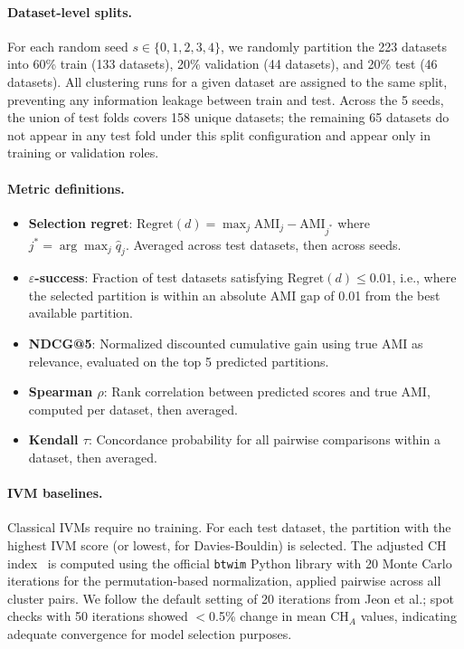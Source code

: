 \documentclass[10pt]{article} %
\begin{document}
\paragraph{Dataset-level splits.}
For each random seed $s \in \{0, 1, 2, 3, 4\}$, we randomly partition the 223 datasets into 60\% train (133 datasets), 20\% validation (44 datasets), and 20\% test (46 datasets). All clustering runs for a given dataset are assigned to the same split, preventing any information leakage between train and test. Across the 5 seeds, the union of test folds covers 158 unique datasets; the remaining 65 datasets do not appear in any test fold under this split configuration and appear only in training or validation roles.

\paragraph{Metric definitions.}
\begin{itemize}
    \item \textbf{Selection regret}: $\text{Regret}(d) = \max_j \text{AMI}_j - \text{AMI}_{j^*}$ where $j^* = \arg\max_j \hat{q}_j$. Averaged across test datasets, then across seeds.
    \item \textbf{$\varepsilon$-success}: Fraction of test datasets satisfying $\text{Regret}(d) \leq 0.01$, i.e., where the selected partition is within an absolute AMI gap of 0.01 from the best available partition.
    \item \textbf{NDCG@5}: Normalized discounted cumulative gain using true AMI as relevance, evaluated on the top 5 predicted partitions.
    \item \textbf{Spearman $\rho$}: Rank correlation between predicted scores and true AMI, computed per dataset, then averaged.
    \item \textbf{Kendall $\tau$}: Concordance probability for all pairwise comparisons within a dataset, then averaged.
\end{itemize}

\paragraph{IVM baselines.}
Classical IVMs require no training. For each test dataset, the partition with the highest IVM score (or lowest, for Davies-Bouldin) is selected. The adjusted CH index~\citep{jeon2025measuring} is computed using the official \texttt{btwim} Python library with 20 Monte Carlo iterations for the permutation-based normalization, applied pairwise across all cluster pairs. We follow the default setting of 20 iterations from Jeon et al.; spot checks with 50 iterations showed $<$0.5\% change in mean CH$_A$ values, indicating adequate convergence for model selection purposes.
\end{document}
